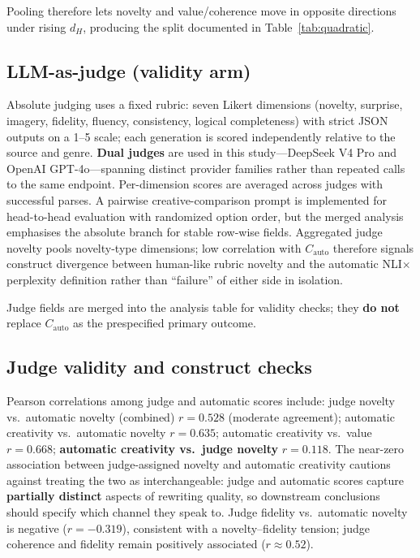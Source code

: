 \documentclass[sigconf,nonacm]{acmart}
\begin{document}
Pooling therefore lets novelty and value/coherence move in opposite directions under rising $d_H$, producing the split documented in Table~\ref{tab:quadratic}.

\subsection{LLM-as-judge (validity arm)}

Absolute judging uses a fixed rubric: seven Likert dimensions (novelty, surprise, imagery, fidelity, fluency, consistency, logical completeness) with strict JSON outputs on a 1--5 scale; each generation is scored independently relative to the source and genre. \textbf{Dual judges} are used in this study---DeepSeek V4 Pro and OpenAI GPT-4o---spanning distinct provider families rather than repeated calls to the same endpoint. Per-dimension scores are averaged across judges with successful parses. A pairwise creative-comparison prompt is implemented for head-to-head evaluation with randomized option order, but the merged analysis emphasises the absolute branch for stable row-wise fields. Aggregated judge novelty pools novelty-type dimensions; low correlation with $C_{\mathrm{auto}}$ therefore signals construct divergence between human-like rubric novelty and the automatic NLI$\times$perplexity definition rather than ``failure'' of either side in isolation.

Judge fields are merged into the analysis table for validity checks; they \textbf{do not} replace $C_{\mathrm{auto}}$ as the prespecified primary outcome.

\subsection{Judge validity and construct checks}

Pearson correlations among judge and automatic scores include: judge novelty vs.\ automatic novelty (combined) $r{=}0.528$ (moderate agreement); automatic creativity vs.\ automatic novelty $r{=}0.635$; automatic creativity vs.\ value $r{=}0.668$; \textbf{automatic creativity vs.\ judge novelty} $r{=}0.118$.
The near-zero association between judge-assigned novelty and automatic creativity cautions against treating the two as interchangeable: judge and automatic scores capture \textbf{partially distinct} aspects of rewriting quality, so downstream conclusions should specify which channel they speak to.
Judge fidelity vs.\ automatic novelty is negative ($r{=}{-}0.319$), consistent with a novelty--fidelity tension; judge coherence and fidelity remain positively associated ($r{\approx}0.52$).
\end{document}
